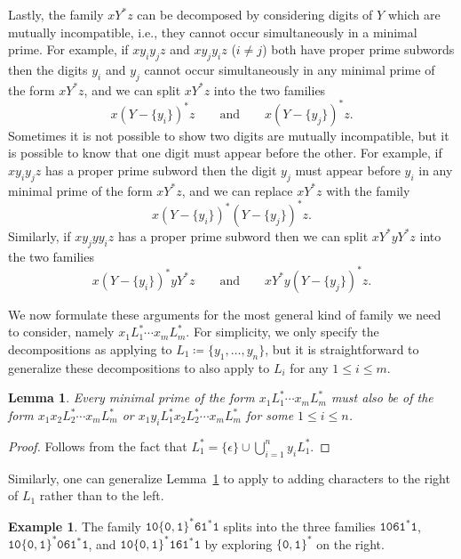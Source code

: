 \documentclass[12pt]{article}
\theoremstyle{plain}
\newtheorem{lemma}[theorem]{Lemma}
\theoremstyle{definition}
\newtheorem{example}[theorem]{Example}
\newcommand{\0}{\mathtt{0}}
\newcommand{\1}{\mathtt{1}}
\newcommand{\2}{\mathtt{2}}
\newcommand{\3}{\mathtt{3}}
\newcommand{\4}{\mathtt{4}}
\newcommand{\5}{\mathtt{5}}
\newcommand{\6}{\mathtt{6}}
\newcommand{\7}{\mathtt{7}}
\newcommand{\8}{\mathtt{8}}
\newcommand{\9}{\mathtt{9}}
\begin{document}
Lastly, the family $xY^*z$ can be decomposed by considering digits of $Y$ which are mutually incompatible,
i.e., they cannot occur simultaneously in a minimal prime.  For example, if $xy_iy_jz$ and $xy_jy_iz$ ($i\neq j$)
both have proper prime subwords then the digits $y_i$ and $y_j$ cannot occur simultaneously in any minimal
prime of the form $xY^*z$, and we can split $xY^*z$ into the two families
\[ x(Y-\{y_i\})^*z \qquad\text{and}\qquad x(Y-\{y_j\})^*z . \]
Sometimes it is not possible to show two digits are mutually incompatible, but it is possible to know that
one digit must appear before the other.  For example, if $xy_iy_jz$ has a proper prime subword then the digit
$y_j$ must appear before $y_i$ in any minimal prime of the form $xY^*z$, and we can replace $xY^*z$
with the family
\[ x(Y-\{y_i\})^*(Y-\{y_j\})^*z . \]
Similarly, if $xy_jyy_iz$ has a proper prime subword then we can split $xY^*yY^*z$ into the two families
\[ x(Y-\{y_i\})^*yY^*z \qquad\text{and}\qquad xY^*y(Y-\{y_j\})^*z . \]

We now formulate these arguments for the most general kind of family we need to consider, namely
$x_1L_1^*\dotsm x_mL_m^*$.  For simplicity, we only specify the decompositions as applying to
$L_1\coloneqq\{y_1,\dotsc,y_n\}$, but it is straightforward to generalize these decompositions
to also apply to $L_i$ for any $1\leq i\leq m$.

\begin{lemma}\label{lemexplore}
Every minimal prime of the form\/ $x_1L_1^*\dotsm x_mL_m^*$ must also be of the form\/
$x_1x_2L_2^*\dotsm x_mL_m^*$ or\/ $x_1y_iL_1^*x_2L_2^*\dotsm x_mL_m^*$ for some\/ $1\leq i\leq n$.
\end{lemma}
\begin{proof}
Follows from the fact that $L_1^*=\{\epsilon\}\cup\bigcup_{i=1}^n y_iL_1^*$.
\end{proof}
Similarly, one can generalize Lemma~\ref{lemexplore} to apply to adding characters to the right of $L_1$ rather than
to the left.
\begin{example}
The family $\1\0\{\0,\1\}^*\6\1^*\1$ splits into the three families $\1\0\6\1^*\1$, $\1\0\{\0,\1\}^*\0\6\1^*\1$, and $\1\0\{\0,\1\}^*\1\6\1^*\1$
by exploring $\{\0,\1\}^*$ on the right.
\end{example}
\end{document}
